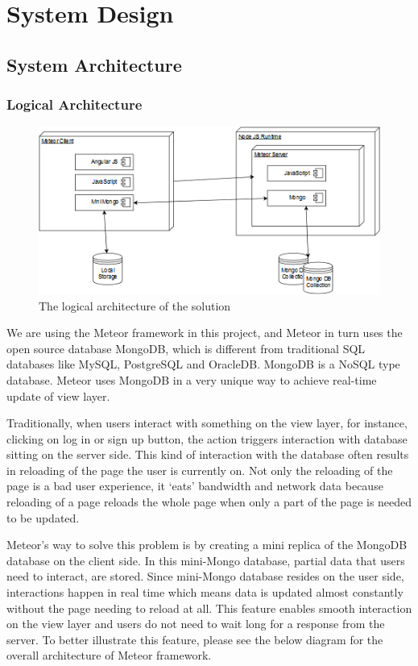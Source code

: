 \chapter{System Design}
\section{System Architecture}
\subsection{Logical Architecture}
\begin{figure}[H]
\centering
\includegraphics{Figures/LogicalArchitecture.png}
\caption{The logical architecture of the solution}
\label{fig:dataModel}
\end{figure}
We are using the Meteor framework in this project, and Meteor in turn uses the open source database MongoDB, which is different from traditional SQL databases like MySQL, PostgreSQL and OracleDB. MongoDB is a NoSQL type database. Meteor uses MongoDB in a very unique way to achieve real-time update of view layer.

Traditionally, when users interact with something on the view layer, for instance, clicking on log in or sign up button, the action triggers interaction with database sitting on the server side. This kind of interaction with the database often results in reloading of the page the user is currently on. Not only the reloading of the page is a bad user experience, it ‘eats’ bandwidth and network data because reloading of a page reloads the whole page when only a part of the page is needed to be updated.

Meteor’s way to solve this problem is by creating a mini replica of the MongoDB database on the client side. In this mini-Mongo database, partial data that users need to interact, are stored. Since mini-Mongo database resides on the user side, interactions happen in real time which means data is updated almost constantly without the page needing to reload at all. This feature enables smooth interaction on the view layer and users do not need to wait long for a response from the server. To better illustrate this feature, please see the below diagram for the overall architecture of Meteor framework. 

